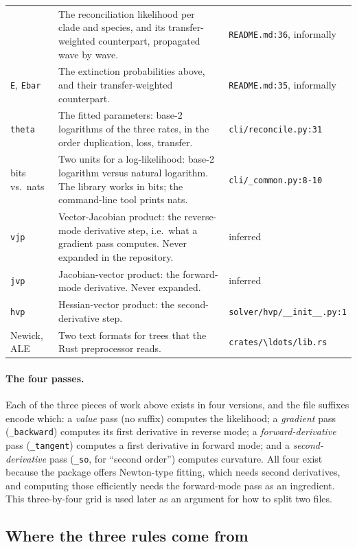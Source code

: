 \documentclass[11pt]{article}
\newcommand{\loc}[1]{\nolinkurl{#1}}
\begin{document}
\begin{center}
\begin{longtable}{@{}p{}p{}p{}@{}}
  & The reconciliation likelihood per clade and species, and its
    transfer-weighted counterpart, propagated wave by wave.
  & \loc{README.md:36}, informally \\
\texttt{E}, \texttt{Ebar}
  & The extinction probabilities above, and their transfer-weighted counterpart.
  & \loc{README.md:35}, informally \\
\texttt{theta}
  & The fitted parameters: base-2 logarithms of the three rates, in the order
    duplication, loss, transfer.
  & \loc{cli/reconcile.py:31} \\
bits vs.\ nats
  & Two units for a log-likelihood: base-2 logarithm versus natural logarithm.
    The library works in bits; the command-line tool prints nats.
  & \loc{cli/\_common.py:8-10} \\
\texttt{vjp}
  & Vector-Jacobian product: the reverse-mode derivative step, i.e.\ what a
    gradient pass computes.  Never expanded in the repository.
  & inferred \\
\texttt{jvp}
  & Jacobian-vector product: the forward-mode derivative.  Never expanded.
  & inferred \\
\texttt{hvp}
  & Hessian-vector product: the second-derivative step.
  & \loc{solver/hvp/\_\_init\_\_.py:1} \\
Newick, ALE
  & Two text formats for trees that the Rust preprocessor reads.
  & \loc{crates/\ldots/lib.rs} \\
\bottomrule
\end{longtable}
\end{center}

\paragraph{The four passes.}  Each of the three pieces of work above exists in
four versions, and the file suffixes encode which: a \emph{value} pass (no
suffix) computes the likelihood; a \emph{gradient} pass
(\texttt{\_backward}) computes its first derivative in reverse mode; a
\emph{forward-derivative} pass (\texttt{\_tangent}) computes a first derivative
in forward mode; and a \emph{second-derivative} pass (\texttt{\_so}, for
``second order'') computes curvature.  All four exist because the package
offers Newton-type fitting, which needs second derivatives, and computing those
efficiently needs the forward-mode pass as an ingredient.  This
three-by-four grid is used later as an argument for how to split two files.

\subsection{Where the three rules come from}
\label{sec:rules}
\end{document}
